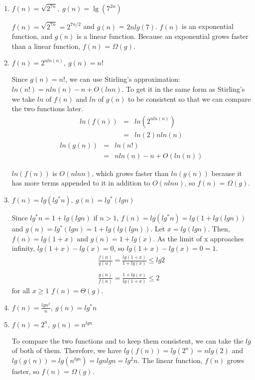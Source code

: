 \documentclass{article}
\begin{document}
\begin{enumerate}
\item $f(n) = \sqrt{2^{7n}},\ g(n) = \lg({7^{2n}})$

$f(n) = \sqrt{2^{7n}} = 2^{7n/2}$ and $g(n)$ = $2n lg(7)$. $f(n)$ is an exponential function, and $g(n)$ is a linear function. Because an exponential grows faster than a linear function, $f(n)$ = $\Omega(g)$. 

\item $f(n) = 2^{nln(n)},\ g(n) = n!$

Since $g(n) = n!$, we can use Stirling's approximation: $ln(n!) = n ln(n) - n + O(ln n)$. To get it in the same form as Stirling's we take $ln$ of $f(n)$ and $ln$ of $g(n)$ to be consistent so that we can compare the two functions later.
\begin{eqnarray*}
	ln(f(n)) &=& ln(2^{nln(n)}) \\
		&=& ln(2)nln(n)
\end{eqnarray*}
\begin{eqnarray*}
	ln(g(n)) &=& ln(n!) \\
		&=& nln(n)-n+O(ln(n))	
\end{eqnarray*}

$ln(f(n))$ is $O(nlnn)$, which grows faster than $ln(g(n))$ because it has more terms appended to it in addition to $O(nlnn)$, so $f(n)$ = $\Omega(g)$.

\item $f(n) = lg(lg^*n),\  g(n) = lg^*(lgn)$

Since $lg^*n = 1+lg(lgn)$ if $n>1$, $f(n)=lg(lg^*n)=lg(1+lg(lgn))$ and $g(n)=lg^*(lgn)=1+lg(lg(lgn))$. Let $x=lg(lgn)$. Then, $f(n)=lg(1+x)$ and $g(n)=1+lg(x)$. As the limit of x approaches infinity, $lg(1+x)-lg(x)=0$, so $lg(1+x)-lg(x)=0=1$.
\begin{eqnarray*}
	\frac{f(n)}{g(n)} = \frac{lg(1+x)}{1+lg(x)} \leq lg2
	\\\\
	\frac{g(n)}{f(n)} = \frac{1+lg(x)}{lg(1+x)} \leq 2
\end{eqnarray*}
for all $x\geq1$  $f(n)=\Theta(g)$.


\item $f(n) = \frac{lgn^2}{n},\ g(n) = lg^*n$

\item $f(n) = 2^n,\ g(n) = n^{lgn}$

To compare the two functions and to keep them consistent, we can take the $lg$ of both of them. Therefore, we have $lg(f(n))=lg(2^n)=nlg(2)$ and $lg(g(n))=lg(n^{lgn})=lgnlgn=lg^2n$. The linear function, $f(n)$ grows faster, so $f(n)$ = $\Omega(g)$.


\end{enumerate}
\end{document}
